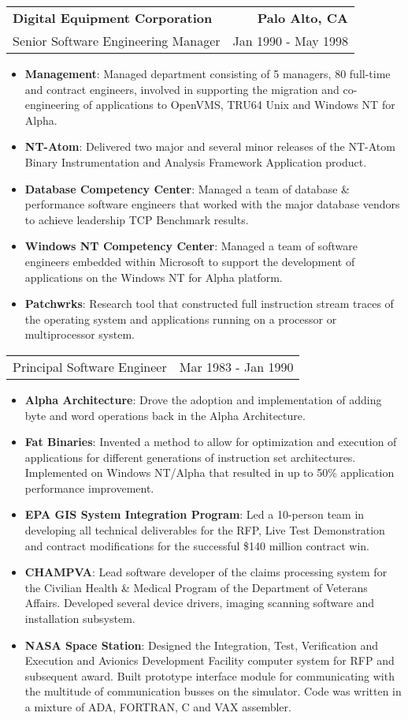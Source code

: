 \documentclass[letterpaper,11pt]{article}
\makeatletter
\newcommand{\resumeCompanyHeading}[4]{
  \vspace{-1pt}
    \item
    \begin{tabular*}{1.0\textwidth}[t]{l@{\extracolsep{\fill}}r}
      \textbf{#1} & \textbf{#2} \\
      {#3} & {#4}
    \end{tabular*}\vspace{-10pt}
  }
\newcommand{\resumeCompanyPositionHeading}[2]{
      \item
      \begin{tabular*}{1.0\textwidth}{l@{\extracolsep{\fill}}r}
        {#1} & {#2}
    \end{tabular*}\vspace{-10pt}
}
\newcommand{\resumeItem}[2]{\item{{\textbf{\small#1}}: {\small#2 \vspace{-1pt}}}}
\newcommand{\resumeItemListStart}{\begin{itemize}}
\newcommand{\resumeItemListEnd}{\end{itemize}}\vspace{-10pt}
\makeatother
\begin{document}
        \resumeCompanyHeading
          {Digital Equipment Corporation}{Palo Alto, CA}
          {Senior Software Engineering Manager }{Jan 1990 - May 1998}
                 \resumeItemListStart
                 \resumeItem{Management}{Managed department consisting of 5 managers, 80 full-time and contract engineers, involved in supporting the migration and
                                        co-engineering of applications to OpenVMS, TRU64 Unix and Windows NT for Alpha.}
                 \resumeItem{NT-Atom}{Delivered two major and several minor releases of the NT-Atom Binary Instrumentation
                             and Analysis Framework Application product.}
                \resumeItem{Database Competency Center}{Managed a team of database \& performance software engineers that worked with 
                            the major database vendors to achieve leadership TCP Benchmark results.}
                \resumeItem{Windows NT Competency Center}{Managed a team of software engineers embedded within Microsoft to support the development of applications
                            on the Windows NT for Alpha platform.}
                \resumeItem{Patchwrks}{Research tool that constructed full instruction stream traces of the operating system and applications running on a processor 
                            or multiprocessor system.}
            \resumeItemListEnd

        \resumeCompanyPositionHeading
          {Principal Software Engineer}{Mar 1983 - Jan 1990}
          \resumeItemListStart
            \resumeItem{Alpha Architecture}{Drove the adoption and implementation of adding byte and word operations back in the Alpha Architecture.}
            \resumeItem{Fat Binaries}{Invented a method to allow for optimization and execution of applications for different generations 
              of instruction set architectures.  Implemented on Windows NT/Alpha that resulted in up to 50\% application performance improvement.}
            \resumeItem{EPA GIS System Integration Program}{Led a 10-person team in developing all technical deliverables for the RFP, Live Test Demonstration and contract
              modifications for the successful \$140 million contract win.}
            \resumeItem{CHAMPVA}{Lead software developer of the claims processing system for the Civilian Health \& Medical Program of the 
              Department of Veterans Affairs.  Developed several device drivers, imaging scanning software and installation subsystem.}
            \resumeItem{NASA Space Station}{Designed the Integration, Test, Verification and Execution and Avionics Development Facility computer system for 
              RFP and subsequent award. Built  prototype interface module for communicating with the multitude of communication busses on the simulator. 
              Code was written in a mixture of ADA, FORTRAN, C and VAX assembler.}
          \resumeItemListEnd
    
\end{document}
